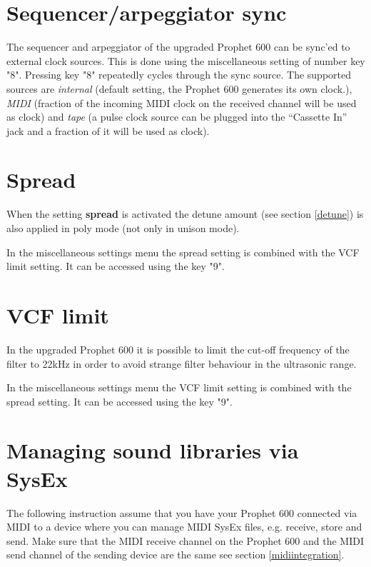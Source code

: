 \documentclass[draft,landscape, 11pt, oneside]{report}
\newenvironment{flowtext}{\addmargin[0cm]{7cm}}{\endaddmargin} %
\begin{document}
\begin{flowtext}
\section{Sequencer/arpeggiator sync}\label{sync}

The sequencer and arpeggiator of the upgraded Prophet 600 can be sync'ed to external clock sources. This is done using the miscellaneous setting of number key "8". Pressing key "8" repeatedly cycles through the sync source. The supported sources are \textit{internal} (default setting, the Prophet 600 generates its own clock.), \textit{MIDI} (fraction of the incoming MIDI clock on the received channel will be used as clock) and \textit{tape} (a pulse clock source can be plugged into the “Cassette In” jack and a fraction of it will be used as clock).

\section{Spread}\label{spreadsett}

When the setting \textbf{spread} is activated the detune amount (see section \ref{detune}) is also applied in poly mode (not only in unison mode). 

In the miscellaneous settings menu the spread setting is combined with the VCF limit setting. It can be accessed using the key "9".

\section{VCF limit}\label{limitsett}

In the upgraded Prophet 600 it is possible to limit the cut-off frequency of the filter to 22kHz in order to avoid strange filter behaviour in the ultrasonic range.

In the miscellaneous settings menu the VCF limit setting is combined with the spread setting. It can be accessed using the key "9".  

\section{Managing sound libraries via SysEx}\label{mididump}

The following instruction assume that you have your Prophet 600 connected via MIDI to a device where you can manage MIDI SysEx files, e.g. receive, store and send. Make sure that the MIDI receive channel on the Prophet 600 and the MIDI send channel of the sending device are the same see section \ref{midiintegration}.


\end{flowtext}
\end{document}
